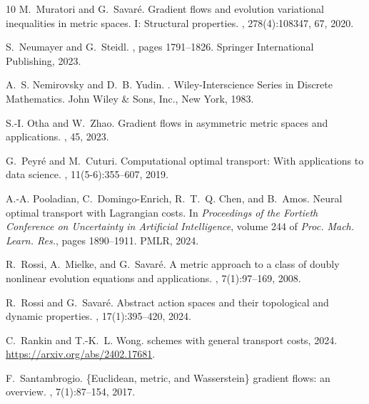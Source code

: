 \documentclass[reqno]{amsart}
\theoremstyle{plain}
\theoremstyle{remark}
\theoremstyle{plain}
\numberwithin{equation}{section}
\theoremstyle{remark}
\begin{document}
\begin{thebibliography}{10}
M.~Muratori and G.~Savar\'e.
\newblock Gradient flows and evolution variational inequalities in metric
  spaces. {I}: {S}tructural properties.
, 278(4):108347, 67, 2020.

S.~Neumayer and G.~Steidl.
, pages 1791--1826.
\newblock Springer International Publishing, 2023.

A.~S. Nemirovsky and D.~B. Yudin.
.
\newblock Wiley-Interscience Series in Discrete Mathematics. John Wiley \&
  Sons, Inc., New York, 1983.

S.-I. Otha and W.~Zhao.
\newblock Gradient flows in asymmetric metric spaces and applications.
, 45, 2023.

G.~Peyré and M.~Cuturi.
\newblock Computational optimal transport: With applications to data science.
, 11(5-6):355--607,
  2019.

A.-A. Pooladian, C.~Domingo-Enrich, R.~T.~Q. Chen, and B.~Amos.
\newblock Neural optimal transport with {L}agrangian costs.
\newblock In {\em Proceedings of the Fortieth Conference on Uncertainty in
Artificial Intelligence}, volume 244 of {\em Proc. Mach. Learn. Res.}, pages
1890--1911. PMLR, 2024.


R.~Rossi, A.~Mielke, and G.~Savar\'e.
\newblock A metric approach to a class of doubly nonlinear evolution equations
  and applications.
, 7(1):97--169, 2008.

R.~Rossi and G.~Savar\'e.
\newblock Abstract action spaces and their topological and dynamic properties.
, 17(1):395--420, 2024.

C.~Rankin and T.-K.~L. Wong.
 schemes with general transport costs, 2024.
\newblock \url{https://arxiv.org/abs/2402.17681}.

F.~Santambrogio.
\newblock \{{E}uclidean, metric, and {W}asserstein\} gradient flows: an
  overview.
, 7(1):87--154, 2017.


\end{thebibliography}
\end{document}
